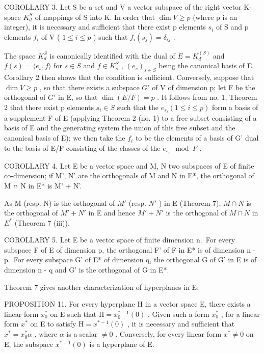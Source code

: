 COROLLARY 3. Let S be a set and V a vector subspace of the right vector K-space \(K_{d}^{S}\) of mappings of S into K. In order that \(\dim V \geqslant p\) (where p is an integer), it is necessary and sufficient that there exist p elements \(s_{i}\) of S and p elements \(f_{i}\) of V ( \(1 \leqslant i \leqslant p\) ) such that \(f_{i}(s_{j}) = \delta_{ij}\) .

The space \(K_{d}^{S}\) is canonically identified with the dual of \(E = K_{d}^{(S)}\) and \(f(s) = \langle e_{s}, f \rangle\) for \(s \in S\) and \(f \in K_{s}^{S}\) , \((e_{s})_{s \in S}\) being the canonical basis of E. Corollary 2 then shows that the condition is sufficient. Conversely, suppose that \(\dim V \geqslant p\) , so that there exists a subspace \(G'\) of V of dimension p; let F be the orthogonal of \(G'\) in E, so that \(\dim(E/F) = p\) . It follows from no. 1, Theorem 2 that there exist p elements \(s_{i} \in S\) such that the \(e_{s_{i}} (1 \leqslant i \leqslant p)\) form a basis of a supplement F of E (applying Theorem 2 (no. 1) to a free subset consisting of a basis of E and the generating system the union of this free subset and the canonical basis of E); we then take the \(f_{i}\) to be the elements of a basis of G' dual to the basis of E/F consisting of the classes of the \(e_{s_{i}} \mod F\) .

COROLLARY 4. Let E be a vector space and M, N two subspaces of E of finite co-dimension; if M', N' are the orthogonals of M and N in E*, the orthogonal of M ∩ N in E* is M' + N'.

As M (resp. N) is the orthogonal of \(M'\) (resp. \(N'\) ) in E (Theorem 7), \(M \cap N\) is the orthogonal of \(M' + N'\) in E and hence \(M' + N'\) is the orthogonal of \(M \cap N\) in \(E^*\) (Theorem 7 (iii)).

COROLLARY 5. Let E be a vector space of finite dimension n.~For every subspace F of E of dimension p, the orthogonal F' of F in E* is of dimension n - p.~For every subspace G' of E* of dimension q, the orthogonal G of G' in E is of dimension n - q and G' is the orthogonal of G in E*.

Theorem 7 gives another characterization of hyperplanes in E:

PROPOSITION 11. For every hyperplane H in a vector space E, there exists a linear form \(x_0^*\) on E such that \(\mathrm{H} = x_0^{*-1}(0)\) . Given such a form \(x_0^*\) , for a linear form \(x^*\) on E to satisfy \(\mathrm{H} = x^{*-1}(0)\) , it is necessary and sufficient that \(x^* = x_0^*\alpha\) , where \(\alpha\) is a scalar \(\neq 0\) . Conversely, for every linear form \(x^* \neq 0\) on E, the subspace \(x^{*-1}(0)\) is a hyperplane of E.

